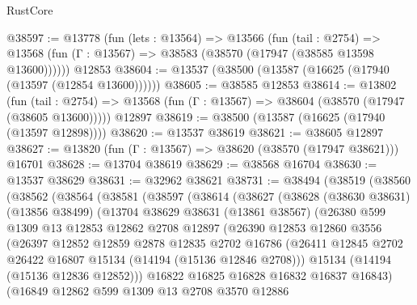 \begin{lexlean}{RustCore}
\begin{coremodule}
@38597 := @13778
    (fun (lets : @13564) =>
    @13566
      (fun (tail : @2754) =>
      @13568 (fun (Γ : @13567) => @38583 (@38570 (@17947 (@38585 @13598 @13600))))))
    @12853
@38604 := @13537 (@38500 (@13587 (@16625 (@17940 (@13597 (@12854 @13600))))))
@38605 := @38585 @12853
@38614 := @13802
    (fun (tail : @2754) => @13568 (fun (Γ : @13567) => @38604 (@38570 (@17947 (@38605 @13600)))))
    @12897
@38619 := @38500 (@13587 (@16625 (@17940 (@13597 @12898))))
@38620 := @13537 @38619
@38621 := @38605 @12897
@38627 := @13820 (fun (Γ : @13567) => @38620 (@38570 (@17947 @38621))) @16701
@38628 := @13704 @38619
@38629 := @38568 @16704
@38630 := @13537 @38629
@38631 := @32962 @38621
@38731 := @38494
    (@38519
      (@38560
        (@38562
          (@38564
            (@38581
              (@38597
                (@38614
                  (@38627
                    (@38628
                      (@38630 @38631)
                      (@13856 @38499)
                      (@13704
                        @38629
                        @38631
                        (@13861 @38567)
                        (@26380
                          @599
                          @1309
                          @13
                          @12853
                          @12862
                          @2708
                          @12897
                          (@26390
                            @12853
                            @12860
                            @3556
                            (@26397
                              @12852
                              @12859
                              @2878
                              @12835
                              @2702
                              @16786
                              (@26411
                                @12845
                                @2702
                                @26422
                                @16807
                                @15134
                                (@14194 (@15136 @12846 @2708)))
                              @15134
                              (@14194 (@15136 @12836 @12852)))
                            @16822
                            @16825
                            @16828
                            @16832
                            @16837
                            @16843)
                          (@16849
                            @12862
                            @599
                            @1309
                            @13
                            @2708
                            @3570
                            @12886

\end{coremodule}
\end{lexlean}
